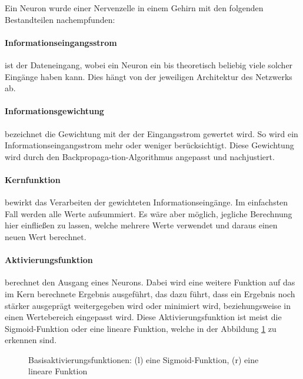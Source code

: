 Ein Neuron wurde einer Nervenzelle in einem Gehirn mit den folgenden Bestandteilen nachempfunden:
\paragraph{Informationseingangsstrom} ist der Dateneingang, wobei ein Neuron ein bis theoretisch beliebig viele solcher Eingänge haben kann. 
Dies hängt von der jeweiligen Architektur des Netzwerks ab.

\paragraph{Informationsgewichtung} bezeichnet die Gewichtung mit der der Eingangsstrom gewertet wird. 
So wird ein Informationseingangsstrom mehr oder weniger berücksichtigt. 
Diese Gewichtung wird durch den Backpropaga-tion-Algorithmus angepasst und nachjustiert.

\paragraph{Kernfunktion} bewirkt das Verarbeiten der gewichteten Informationseingänge. 
Im einfachsten Fall werden alle Werte aufsummiert. 
Es wäre aber möglich, jegliche Berechnung hier einfließen zu lassen, welche mehrere Werte verwendet und daraus einen neuen Wert berechnet.

\paragraph{Aktivierungsfunktion} berechnet den Ausgang eines Neurons. 
Dabei wird eine weitere Funktion auf das im Kern berechnete Ergebnis ausgeführt, das dazu führt, dass ein Ergebnis noch stärker ausgeprägt weitergegeben wird oder minimiert wird, beziehungsweise in einen Wertebereich eingepasst wird. 
Diese Aktivierungsfunktion ist meist die Sigmoid-Funktion oder eine lineare Funktion, welche in der Abbildung \ref{fig:Aktivierungsfunktion} zu erkennen sind.

\begin{figure}[ht!]
\centering
{}
	\caption{Basisaktivierungsfunktionen: (l) eine Sigmoid-Funktion, (r) eine lineare Funktion}
	\label{fig:Aktivierungsfunktion}
\end{figure}

